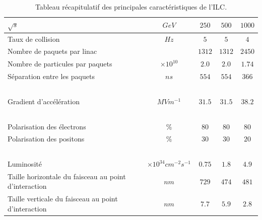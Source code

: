 \begin{table}[!ht]
  \begin{center}
    \begin{tabular}{>{\centering}m{7cm}|c|c|c|c}
      \rowcolor{black!20!white}$\sqrt{s}$ & $GeV$ & $250$ & $500$ & $1000$ \\
      \hline
      \rowcolor{black!5!white}Taux de collision & $Hz$ & $5$ & $5$ & $4$ \\
      \rowcolor{black!5!white}Nombre de paquets par linac & $ $ & $1312$ & $1312$ & $2450$ \\
      \rowcolor{black!5!white}Nombre de particules par paquets & $\times 10^{10}$ & $2.0$ & $2.0$ & $1.74$ \\
      \rowcolor{black!5!white}Séparation entre les paquets & $ns$ & $554$ & $554$ & 366 \\
      \rowcolor{black!5!white}$ $ & $ $ & $ $ & $ $ & $ $ \\
      \rowcolor{black!5!white}Gradient d'accélération & $MVm^{-1}$ & $31.5$ & $31.5$ & $38.2$\\
      \rowcolor{black!5!white}$ $ & $ $ & $ $ & $ $ & $ $ \\
      \rowcolor{black!5!white}Polarisation des électrons & $\%$ & $80$ & $80$ & $80$ \\
      \rowcolor{black!5!white}Polarisation des positons & $\%$ & $30$ & $30$ & $20$ \\
      \rowcolor{black!5!white}$ $ & $ $ & $ $ & $ $ & $ $ \\
      \rowcolor{black!5!white}Luminosité & $\times 10^{34} cm^{-2} s^{-1}$ & $0.75$ & $1.8$ & $4.9$ \\
      \rowcolor{black!5!white}Taille horizontale du faisceau au point d'interaction & $nm$ & $729$ & $474$ & $481$ \\
      \rowcolor{black!5!white}Taille verticale du faisceau au point d'interaction & $nm$ & $7.7$ & $5.9$ & $2.8$ \\
    \end{tabular}
  \end{center}  
  \caption{Tableau récapitulatif des principales caractéristiques de l'ILC.}
  \label{tab.ilc-params}
\end{table}

